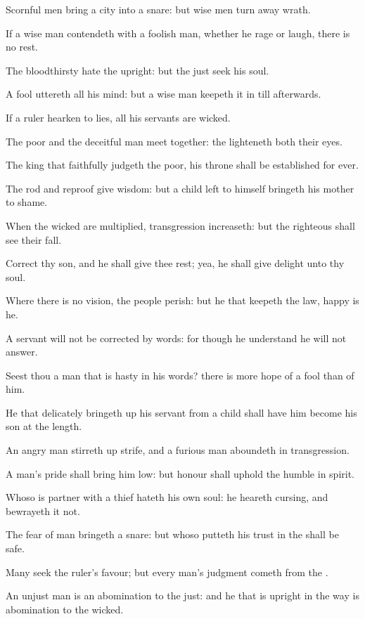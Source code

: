 \Verse Scornful men bring a city into a snare: but wise men turn away wrath.

\Verse If a wise man contendeth with a foolish man, whether he rage or laugh, there is no rest.

\Verse The bloodthirsty hate the upright: but the just seek his soul.

\Verse A fool uttereth all his mind: but a wise man keepeth it in till afterwards.

\Verse If a ruler hearken to lies, all his servants are wicked.

\Verse The poor and the deceitful man meet together: the \LORD lighteneth both their eyes.

\Verse The king that faithfully judgeth the poor, his throne shall be established for ever.

\Verse The rod and reproof give wisdom: but a child left to himself bringeth his mother to shame.

\Verse When the wicked are multiplied, transgression increaseth: but the righteous shall see their fall.

\Verse Correct thy son, and he shall give thee rest; yea, he shall give delight unto thy soul.

\Verse Where there is no vision, the people perish: but he that keepeth the law, happy is he.

\Verse A servant will not be corrected by words: for though he understand he will not answer.

\Verse Seest thou a man that is hasty in his words? there is more hope of a fool than of him.

\Verse He that delicately bringeth up his servant from a child shall have him become his son at the length.

\Verse An angry man stirreth up strife, and a furious man aboundeth in transgression.

\Verse A man's pride shall bring him low: but honour shall uphold the humble in spirit.

\Verse Whoso is partner with a thief hateth his own soul: he heareth cursing, and bewrayeth it not.

\Verse The fear of man bringeth a snare: but whoso putteth his trust in the \LORD shall be safe.

\Verse Many seek the ruler's favour; but every man's judgment cometh from the \LORD.

\Verse An unjust man is an abomination to the just: and he that is upright in the way is abomination to the wicked.


